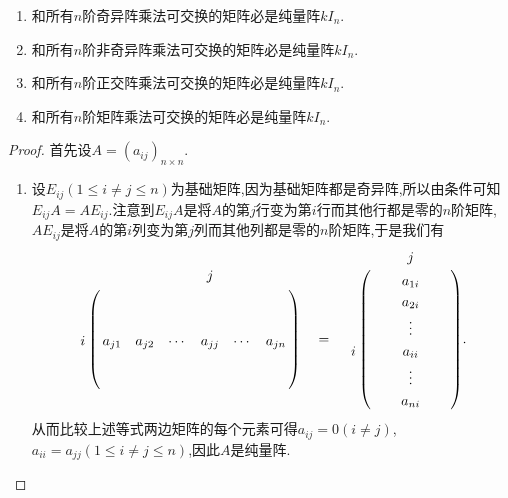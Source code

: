 \documentclass[../../main.tex]{subfiles}%
\begin{document}
\begin{proposition}[纯量矩阵的刻画]\label{proposition:纯量阵的刻画}
\begin{enumerate}
\item 和所有\(n\)阶奇异阵乘法可交换的矩阵必是纯量阵\(kI_{n}\).

\item 和所有\(n\)阶非奇异阵乘法可交换的矩阵必是纯量阵\(kI_{n}\).

\item 和所有\(n\)阶正交阵乘法可交换的矩阵必是纯量阵\(kI_{n}\).

\item 和所有\(n\)阶矩阵乘法可交换的矩阵必是纯量阵\(kI_{n}\).
\end{enumerate}
\end{proposition}
\begin{proof}
首先设$A=(a_{ij})_{n\times n}$.
\begin{enumerate}
\item 设\(E_{ij}(1\leqslant  i\neq j\leqslant  n)\)为基础矩阵,因为基础矩阵都是奇异阵,所以由条件可知\(E_{ij}A = AE_{ij}\).注意到\(E_{ij}A\)是将\(A\)的第\(j\)行变为第\(i\)行而其他行都是零的\(n\)阶矩阵,\(AE_{ij}\)是将\(A\)的第\(i\)列变为第\(j\)列而其他列都是零的\(n\)阶矩阵,于是我们有
\begin{align*}
\bordermatrix{%
&    &		&		&		j&		&
\cr
&    &		&		&		&		&		\cr
&   &		&		&		&		&		\cr
i&    a_{j1}&		a_{j2}&		\cdots&		a_{jj}&		\cdots&		a_{jn}
\cr
&    &		&		&		&		&		\cr
&    &		&		&		&		&		\cr
} \quad= \quad \bordermatrix{%
&    &       &             j&     &
\cr
&    &		&		a_{1i}&		&		\cr
&    &		&		a_{2i}&		&		\cr
&    &		&		\vdots&		&		\cr
i&    &		&		a_{ii}&		&		\cr
&    &		&		\vdots&		&		\cr
&    &		&		a_{ni}&		&		\cr
}.
\end{align*}
从而比较上述等式两边矩阵的每个元素可得\(a_{ij}=0(i\neq j)\),\(a_{ii}=a_{jj}(1\leqslant  i\neq j\leqslant  n)\),因此\(A\)是纯量阵.


\end{enumerate}
\end{proof}
\end{document}
